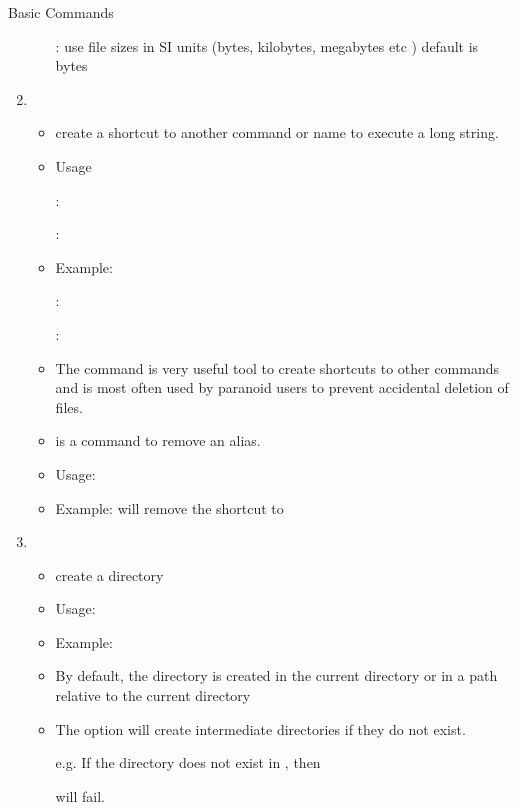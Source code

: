 \documentclass[10pt,t]{beamer}
\begin{document}
\begin{frame}{Basic Commands}
\begin{enumerate}
\begin{itemize}
    \item[] : use file sizes in SI units (bytes, kilobytes, megabytes etc ) default is bytes
    \end{itemize}
    \framebreak
  \item {}
    \begin{itemize}
    \item  create a shortcut to another command or name to execute a long string.
    \item Usage 
    \item[] : 
    \item[] : 
    \item Example: 
    \item[] : 
    \item[] : 
    \item The  command is very useful tool to create shortcuts to other commands and is most often used by paranoid users to prevent accidental deletion of files. 
    \item {} is a command to remove an alias.
    \item Usage: 
    \item Example:  will remove the shortcut to 
    \end{itemize}
    \framebreak
  \item {} 
    \begin{itemize}
    \item create a directory
    \item Usage: 
    \item Example: 
    \item By default, the directory is created in the current directory or in a path relative to the current directory
    \item The  option will create intermediate directories if they do not exist.
    \item[e.g.] If the directory  does not exist in , then 
    \item[]  will fail. 

\end{itemize}
\end{enumerate}
\end{frame}
\end{document}
